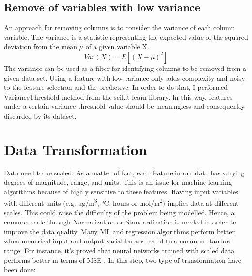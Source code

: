 \subsection{Remove of variables with low variance}
An approach for removing columns is to consider the variance of each column variable. The variance is a statistic representing the expected value of the squared deviation from the mean $\mu$ of a given variable X. 
\begin{equation}
  Var(X) = E[(X-\mu)^2]
\end{equation}
The variance can be used as a filter for identifying columns to be removed from a given data set. 
Using a feature with low-variance only adds complexity and noisy to the feature selection and the predictive.\newline
In order to do that, I performed VarianceThreshold method from the scikit-learn library. In this way, features under a certain variance threshold value should be meaningless and consequently discarded by its dataset. 
\section{Data Transformation}
Data need to be scaled. As a matter of fact, each feature in our data has varying degrees of magnitude, range, and units. This is an issue for machine learning algorithms because of highly sensitive to these features. 
Having input variables with different units (e.g. ug/m\textsuperscript{3}, °C, hours or mol/m\textsuperscript{2}) implies data at different scales. This could raise the difficulty of the problem being modelled. \newline
Hence, a common scale through Normalization or Standardization is needed in order to improve the data quality.\newline
Many ML and regression algorithms perform better when numerical input and output variables are scaled to a common standard range. \newline
For instance, it's proved that neural networks trained with scaled data performs better in terms of MSE \cite{shanker1996effect}.
In this step, two type of transformation have been done:
